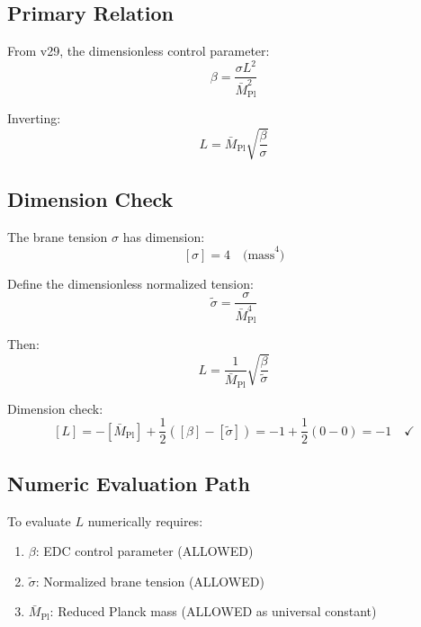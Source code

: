 \documentclass[11pt,a4paper]{article}
\begin{document}
\subsection{Primary Relation}
\label{subsec:L-primary}

From v29, the dimensionless control parameter:
\begin{equation}
\label{eq:beta-def}
\beta = \frac{\sigma L^2}{\bar{M}_{\text{Pl}}^2}
\end{equation}

Inverting:
\begin{equation}
\label{eq:L-from-beta}
\boxed{L = \bar{M}_{\text{Pl}} \sqrt{\frac{\beta}{\sigma}}}
\end{equation}

\subsection{Dimension Check}
\label{subsec:L-dim-check}

The brane tension $\sigma$ has dimension:
\begin{equation}
\label{eq:sigma-dim}
[\sigma] = 4 \quad \text{(mass}^4\text{)}
\end{equation}

Define the dimensionless normalized tension:
\begin{equation}
\label{eq:sigma-tilde-def}
\tilde{\sigma} = \frac{\sigma}{\bar{M}_{\text{Pl}}^4}
\end{equation}

Then:
\begin{equation}
\label{eq:L-dimensionless}
L = \frac{1}{\bar{M}_{\text{Pl}}} \sqrt{\frac{\beta}{\tilde{\sigma}}}
\end{equation}

Dimension check:
\begin{equation}
\label{eq:L-dim-verify}
[L] = -[\bar{M}_{\text{Pl}}] + \frac{1}{2}([\beta] - [\tilde{\sigma}]) = -1 + \frac{1}{2}(0 - 0) = -1 \quad \checkmark
\end{equation}

\subsection{Numeric Evaluation Path}
\label{subsec:L-numeric}

To evaluate $L$ numerically requires:
\begin{enumerate}
\item $\beta$: EDC control parameter (ALLOWED)
\item $\tilde{\sigma}$: Normalized brane tension (ALLOWED)
\item $\bar{M}_{\text{Pl}}$: Reduced Planck mass (ALLOWED as universal constant)
\end{enumerate}
\end{document}
